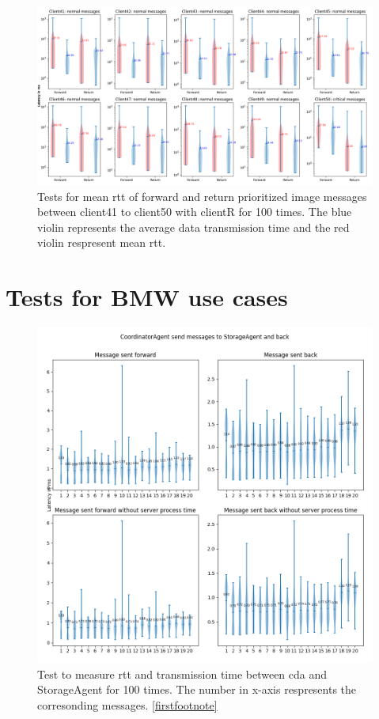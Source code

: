\begin{figure}
    \includegraphics[width=\textheight]{figures/appendix/priority_tests/log_violin_50clients_image_figure_5.png}\hfill 
    \caption{Tests for mean \gls{rtt} of forward and return prioritized image messages between client41 to client50 
    with clientR for 100 times. The blue violin represents the average data transmission time and the red violin 
    respresent mean \gls{rtt}.} \label{fig: priority-50clients-image-e}
\end{figure}




\newpage
\section{Tests for BMW use cases}\label{chap: append-UC}

\begin{figure}[h]
    \includegraphics[width=\textwidth]{figures/appendix/usecase/violin_CoordinatorAgent_to_StorageAgent.png}
    \centering
    \caption{Test to measure \gls{rtt} and transmission time between \gls{cda} and 
    StorageAgent for 100 times. The number in x-axis respresents the 
    corresonding messages. \protect\ref{firstfootnote}}
    \label{fig: violin-CDA-ST}
\end{figure}


